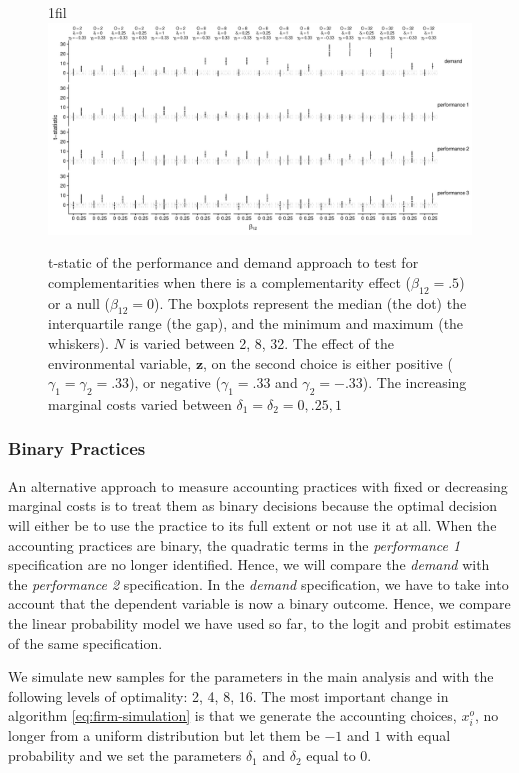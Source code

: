 \documentclass[12pt]{article}
\makeatletter
\newcommand*{\centerfloat}{%
  \parindent \z@
  \leftskip \z@ \@plus 1fil \@minus \textwidth
  \rightskip\leftskip
  \parfillskip \z@skip}
\makeatother
\begin{document}
\begin{figure}
\centerfloat
\includegraphics[width=600px]{figure-latex/delta_plot.pdf}
\caption[The Error Rate and Power with Different Levels of Marginal Costs]
{\label{delta} t-static of the performance and demand approach to test
for complementarities when there is a complementarity effect ($\beta_{12} = .5$)
or a null ($\beta_{12} = 0$). The boxplots represent the median (the dot) the
interquartile range (the gap), and the minimum and maximum (the whiskers). $N$
is varied between 2, 8, 32. The effect of the environmental
variable, $\mathbf{z}$, on the second choice is either positive
($\gamma_1 = \gamma_2 = .33$), or negative ($\gamma_1 = .33$ and $\gamma_2 = -.33$).
The increasing marginal costs varied between $\delta_1 = \delta_2 = 0, .25, 1$}
\end{figure}



\subsubsection{Binary Practices}

An alternative approach to measure accounting practices with fixed or decreasing marginal costs is to treat them as binary decisions because the optimal decision will either be to use the practice to its full extent or not use it at all. When the accounting practices are binary, the quadratic terms in the \emph{performance 1} specification are no longer identified. Hence, we will compare the \emph{demand} with the \emph{performance 2} specification. In the \emph{demand} specification, we have to take into account that the dependent variable is now a binary outcome. Hence, we compare the linear probability model we have used so far, to the logit and probit estimates of the same specification.  

We simulate new samples for the parameters in the main analysis and with the following levels of optimality: 2, 4, 8, 16. The most important change in algorithm \eqref{eq:firm-simulation} is that we generate the accounting choices, $x_i^o$, no longer from a uniform distribution but let them be $-1$ and $1$ with equal probability and we set the parameters $\delta_1$ and $\delta_2$ equal to $0$.
\end{document}
